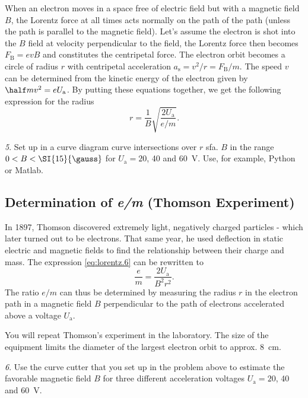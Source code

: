 \documentclass[../Elmag-labhefte-2020.tex]{subfiles}
\begin{document}
When an electron moves in a space free of electric field but with a magnetic field $B$, the Lorentz force at all times acts normally on the path of the path (unless the path is parallel to the magnetic field). Let's assume the electron is shot into the $B$ field at velocity perpendicular to the field, the Lorentz force then becomes $F_\mathrm{B} = evB$ and constitutes the centripetal force. The electron orbit becomes a circle of radius $r$ with centripetal acceleration $a_\mathrm{s} = v^2/r = F_\mathrm{B}/m$. The speed $v$ can be determined from the kinetic energy of the electron given by $\half mv^2 = e U_\mathrm{a}$. By putting these equations together, we get the following expression for the radius
\begin{equation}
    r = \frac{1}{B} \sqrt{\frac{2 U_\mathrm{a}}{e/m}} .
    \label{eq:lorentz.6}
\end{equation}

{\emph 5. Set up in a curve diagram curve intersections over $r$ sfa. $B$ in the range $0 < B < \SI{15}{\gauss}$ for $U_\mathrm{a} = 20$, \num{40} and \SI{60}{\volt}}. Use, for example, Python or Matlab.


\subsection{Determination of \textsl{e/m} (Thomson Experiment)}
 
In 1897, Thomson discovered
extremely light, negatively charged particles - which later turned out to be electrons. That same year, he used deflection in static electric and magnetic fields to find the relationship between their charge and mass. The expression \eqref{eq:lorentz.6} can be rewritten to
\begin{equation}
    \frac{e}{m} = \frac{2 U_\mathrm{a}} {B^2 r^2}.
    \label{eq:lorentz.7}
\end{equation}
%
The ratio $e/m$ can thus be determined by measuring the radius $r$ in the electron path in a magnetic field $B$ perpendicular to the path of electrons accelerated above a voltage $U_\mathrm{a}$.

You will repeat Thomson's experiment in the laboratory. The size of the equipment limits the diameter of the largest electron orbit to approx. \SI{8}{\cm}.

{\emph 6. Use the curve cutter that you set up in the problem above to estimate the favorable magnetic field $B$ for three different acceleration voltages $U_\mathrm{a} = 20$, \num{40} and \SI{60}{\volt}.}
 
\end{document}
